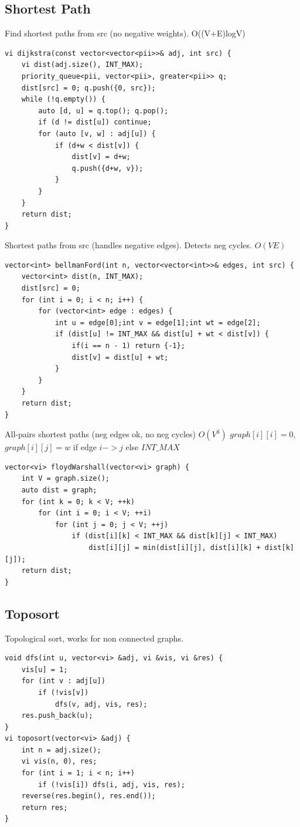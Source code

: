 \documentclass[10pt,a4paper]{article}
\begin{document}
\subsection{Shortest Path}

Find shortest paths from src (no negative weights). O((V+E)logV)
\begin{verbatim}
vi dijkstra(const vector<vector<pii>>& adj, int src) {
    vi dist(adj.size(), INT_MAX);
    priority_queue<pii, vector<pii>, greater<pii>> q;
    dist[src] = 0; q.push({0, src});
    while (!q.empty()) {
        auto [d, u] = q.top(); q.pop();
        if (d != dist[u]) continue;
        for (auto [v, w] : adj[u]) {
            if (d+w < dist[v]) {
                dist[v] = d+w;
                q.push({d+w, v});
            }
        }
    }
    return dist;
}
\end{verbatim}
Shortest paths from src (handles negative edges). Detects neg cycles. $O(VE)$
\begin{verbatim}
vector<int> bellmanFord(int n, vector<vector<int>>& edges, int src) {
	vector<int> dist(n, INT_MAX);
	dist[src] = 0;
	for (int i = 0; i < n; i++) {
		for (vector<int> edge : edges) {
			int u = edge[0];int v = edge[1];int wt = edge[2];
			if (dist[u] != INT_MAX && dist[u] + wt < dist[v]) {
                if(i == n - 1) return {-1};
                dist[v] = dist[u] + wt;
            }
		}
	}
    return dist;
}
\end{verbatim}
All-pairs shortest paths (neg edges ok, no neg cycles) $O(V^3)$
$graph[i][i]=0$, $graph[i][j]=w$ if edge $i->j$ else $INT\_MAX$
\begin{verbatim}
vector<vi> floydWarshall(vector<vi> graph) {
    int V = graph.size();
    auto dist = graph;
    for (int k = 0; k < V; ++k)
        for (int i = 0; i < V; ++i)
            for (int j = 0; j < V; ++j)
                if (dist[i][k] < INT_MAX && dist[k][j] < INT_MAX)
                    dist[i][j] = min(dist[i][j], dist[i][k] + dist[k][j]);
    return dist;
}
\end{verbatim}

\subsection{Toposort}

Topological sort, works for non connected graphs.
\begin{verbatim}
void dfs(int u, vector<vi> &adj, vi &vis, vi &res) {
    vis[u] = 1;
    for (int v : adj[u])
        if (!vis[v])
            dfs(v, adj, vis, res);
    res.push_back(u);
}
vi toposort(vector<vi> &adj) {
    int n = adj.size();
    vi vis(n, 0), res;
    for (int i = 1; i < n; i++)
        if (!vis[i]) dfs(i, adj, vis, res);
    reverse(res.begin(), res.end());
    return res;
}
\end{verbatim}
\end{document}
